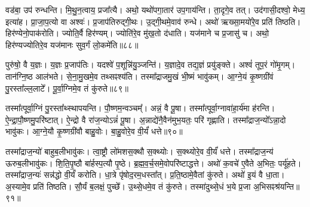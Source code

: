 वड॑बा॒ उप॑ रुन्धन्ति।
मि॒थु॒न॒त्वाय॒ प्रजा᳚त्यै।
अथो॒ यथो॑पगा॒तार॑ उप॒गाय॑न्ति।
ता॒दृगे॒व तत्।
उद॑गासी॒दश्वो॒ मेध्य॒ इत्या॑ह।
प्रा॒जा॒प॒त्यो वा अश्वः॑।
प्र॒जा\-प॑तिरुद्गी॒थः।
उ॒द्गी॒थमे॒वाव॑ रुन्धे।
अथो॑ ऋख्सा॒मयो॑रे॒व प्रति॑ तिष्ठति।
हिर॑ण्येनो॒पाक॑रोति।
ज्योति॒र्वै हिर॑ण्यम्।
ज्योति॑रे॒व मु॑ख॒तो द॑धाति।
यज॑माने च प्र॒जासु॑ च।
अथो॒ हिर॑ण्यज्योतिरे॒व यज॑मानः सुव॒र्गं लो॒कमे॑ति॥८८॥\ip\anuvakamend[तथ्स उ॒पाक॑रोति च॒त्वारि॑ च]

पुरु॑षो॒ वै य॒ज्ञः।
य॒ज्ञः प्र॒जा\-प॑तिः।
यदश्वे॑ प॒शून्नि॑यु॒ञ्जन्ति॑।
य॒ज्ञादे॒व तद्य॒ज्ञं प्रयु॑ङ्क्ते।
अश्वं॑ तूप॒रं गो॑मृ॒गम्।
तान॑ग्नि॒ष्ठ आल॑भते।
से॒ना॒मु॒खमे॒व तथ्सꣴश्य॑ति।
तस्मा᳚द्राजमु॒खं भी॒ष्मं भावु॑कम्।
आ॒ग्ने॒यं कृ॒ष्णग्री॑वं पु॒रस्ता᳚ल्ल॒लाटे᳚।
पू॒र्वा॒ग्निमे॒व तं कु॑रुते॥८९॥\ip

तस्मा᳚त्पूर्वा॒ग्निं पु॒रस्ता᳚थ्स्थापयन्ति।
पौ॒ष्णम॒न्वञ्चम्᳚।
अन्नं॒ वै पू॒षा।
तस्मा᳚त्पूर्वा॒ग्नावा॑\-हा॒र्य॑मा ह॑रन्ति।
ऐ॒न्द्रा॒पौ॒ष्णमु॒परि॑ष्टात्।
ऐ॒न्द्रो वै रा॑ज॒न्यो\-ऽन्नं॑ पू॒षा।
अ॒न्नाद्ये॑नै॒वैन॑मुभ॒यतः॒ परि॑ गृह्णाति।
तस्मा᳚द्राज॒न्यो᳚\-ऽन्ना॒दो भावु॑कः।
आ॒ग्ने॒यौ कृ॒ष्णग्री॑वौ बाहु॒वोः।
बा॒हु॒वोरे॒व वी॒र्यं॑ धत्ते॥९०॥\ip

तस्मा᳚द्राज॒न्यो॑ बाहुब॒लीभावु॑कः।
त्वा॒ष्ट्रौ लो॑मशस॒क्थौ स॒क्थ्योः।
स॒क्थ्योरे॒व वी॒र्यं॑ धत्ते।
तस्मा᳚द्राज॒न्य॑ ऊरुब॒लीभावु॑कः।
शि॒ति॒पृ॒ष्ठौ बा॑र्\mbox{}हस्प॒त्यौ पृ॒ष्ठे।
ब्र॒ह्म॒व॒र्च॒समे॒वोपरि॑ष्टाद्धत्ते।
अथो॑ क॒वचे॑ ए॒वैते अ॒भितः॒ पर्यू॑हते।
तस्मा᳚द्राज॒न्यः॑ सन्न॑द्धो वी॒र्यं॑ करोति।
धा॒त्रे पृ॑षोद॒रम॒धस्ता᳚त्।
प्र॒ति॒ष्ठामे॒वैतां कु॑रुते।
अथो॑ इ॒यं वै धा॒ता।
अ॒स्यामे॒व प्रति॑ तिष्ठति।
सौ॒र्यं ब॒लक्षं॒ पुच्छे᳚।
उ॒थ्से॒धमे॒व तं कु॑रुते।
तस्मा॑दुथ्से॒धं भ॒ये प्र॒जा अ॒भिसꣴश्र॑यन्ति॥९१॥\ip\anuvakamend[कु॒रु॒ते॒ ध॒त्ते॒ कु॒रु॒ते॒ पञ्च॑ च]


\clearpage
{}
\setcounter{anuvakam}{0}

